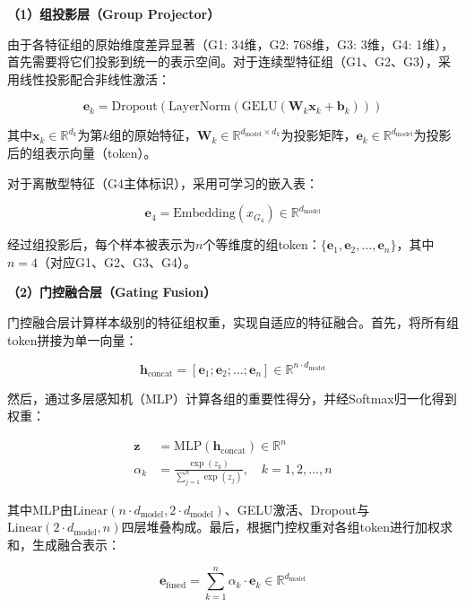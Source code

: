 \textbf{（1）组投影层（Group Projector）}

由于各特征组的原始维度差异显著（G1: 34维，G2: 768维，G3: 3维，G4: 1维），首先需要将它们投影到统一的表示空间。对于连续型特征组（G1、G2、G3），采用线性投影配合非线性激活：

\begin{equation}
\mathbf{e}_k = \text{Dropout}(\text{LayerNorm}(\text{GELU}(\mathbf{W}_k \mathbf{x}_k + \mathbf{b}_k)))
\end{equation}

其中$\mathbf{x}_k \in \mathbb{R}^{d_k}$为第$k$组的原始特征，$\mathbf{W}_k \in \mathbb{R}^{d_{\text{model}} \times d_k}$为投影矩阵，$\mathbf{e}_k \in \mathbb{R}^{d_{\text{model}}}$为投影后的组表示向量（token）。

对于离散型特征（G4主体标识），采用可学习的嵌入表：

\begin{equation}
\mathbf{e}_{4} = \text{Embedding}(x_{G_4}) \in \mathbb{R}^{d_{\text{model}}}
\end{equation}

经过组投影后，每个样本被表示为$n$个等维度的组token：$\{\mathbf{e}_1, \mathbf{e}_2, \ldots, \mathbf{e}_n\}$，其中$n=4$（对应G1、G2、G3、G4）。

\textbf{（2）门控融合层（Gating Fusion）}

门控融合层计算样本级别的特征组权重，实现自适应的特征融合。首先，将所有组token拼接为单一向量：

\begin{equation}
\mathbf{h}_{\text{concat}} = [\mathbf{e}_1; \mathbf{e}_2; \ldots; \mathbf{e}_n] \in \mathbb{R}^{n \cdot d_{\text{model}}}
\end{equation}

然后，通过多层感知机（MLP）计算各组的重要性得分，并经Softmax归一化得到权重：

\begin{align}
\mathbf{z} &= \text{MLP}(\mathbf{h}_{\text{concat}}) \in \mathbb{R}^{n} \\
\alpha_k &= \frac{\exp(z_k)}{\sum_{j=1}^{n} \exp(z_j)}, \quad k = 1, 2, \ldots, n
\end{align}

其中MLP由$\text{Linear}(n \cdot d_{\text{model}}, 2 \cdot d_{\text{model}})$、GELU激活、Dropout与$\text{Linear}(2 \cdot d_{\text{model}}, n)$四层堆叠构成。最后，根据门控权重对各组token进行加权求和，生成融合表示：

\begin{equation}
\mathbf{e}_{\text{fused}} = \sum_{k=1}^{n} \alpha_k \cdot \mathbf{e}_k \in \mathbb{R}^{d_{\text{model}}}
\end{equation}

